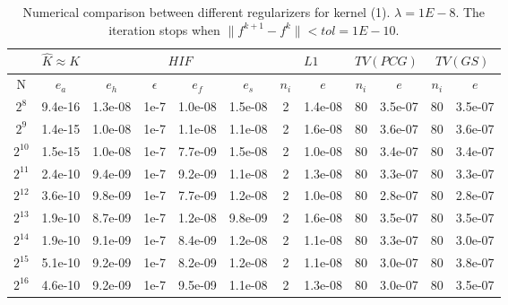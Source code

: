 \documentclass[11pt]{article}
\begin{document}
\begin{table}[!htbp]
\centering
\begin{tabular}{|c|c|c|c|c|c|c|c|c|c|c|c|}
\hline
\multicolumn{1}{c|}{} & \multicolumn{1}{c|}{$\hat{K} \approx K$} & \multicolumn{4}{c|}{$HIF$} & \multicolumn{2}{c|}{$L1$} &\multicolumn{2}{c|}{$TV(PCG)$} & \multicolumn{2}{c|}{$TV(GS)$} \\
\hline
N & $e_{a}$ & $e_{h}$ & $\epsilon$ & $e_{f}$ & $e_{s}$ & $n_{i}$ & $e$  & $n_{i}$ & $e$ &  $n_{i}$ & $e$ \\ 
\hline
$2^{8}$ & 9.4e-16 & 1.3e-08 & 1e-7 & 1.0e-08 & 1.5e-08 & 2 & 1.4e-08 & 80 & 3.5e-07 & 80 & 3.5e-07\\
\hline
$2^{9}$ & 1.4e-15 & 1.0e-08 & 1e-7 & 1.1e-08 & 1.1e-08 & 2 & 1.6e-08 & 80 & 3.6e-07 & 80 & 3.6e-07\\
\hline
$2^{10}$ & 1.5e-15 & 1.0e-08 & 1e-7 & 7.7e-09 & 1.5e-08 & 2 & 1.0e-08 & 80 & 3.4e-07 & 80 & 3.4e-07\\
\hline
$2^{11}$ & 2.4e-10 & 9.4e-09 & 1e-7 & 9.2e-09 & 1.1e-08 & 2 & 1.3e-08 & 80 & 3.3e-07 & 80 & 3.3e-07\\
\hline
$2^{12}$ & 3.6e-10 & 9.8e-09 & 1e-7 & 7.7e-09 & 1.2e-08 & 2 & 1.0e-08 & 80 & 2.8e-07 & 80 & 2.8e-07\\
\hline
$2^{13}$ & 1.9e-10 & 8.7e-09 & 1e-7 & 1.2e-08 & 9.8e-09 & 2 & 1.6e-08 & 80 & 3.5e-07 & 80 & 3.5e-07\\
\hline
$2^{14}$ & 1.9e-10 & 9.1e-09 & 1e-7 & 8.4e-09 & 1.2e-08 & 2 & 1.1e-08 & 80 & 3.3e-07 & 80 & 3.0e-07\\
\hline
$2^{15}$ & 5.1e-10 & 9.2e-09 & 1e-7 & 8.2e-09 & 1.2e-08 & 2 & 1.1e-08 & 80 & 3.0e-07 & 80 & 3.8e-07\\
\hline
$2^{16}$ & 4.6e-10 & 9.2e-09 & 1e-7 & 9.5e-09 & 1.1e-08 & 2 & 1.3e-08 & 80 & 3.0e-07 & 80 & 3.5e-07\\

\end{tabular}

\caption{Numerical comparison between different regularizers for kernel (1). $\lambda = 1E-8$. The iteration stops when $\|f^{k+1}-f^{k}\| < tol=1E-10$.}
\label{1d-k1}
\end{table}
\end{document}
